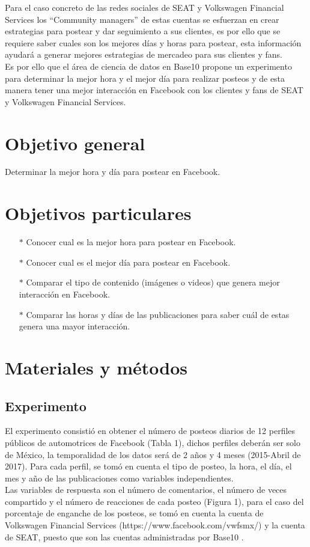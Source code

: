 \documentclass[a4paper,10pt]{article}
\begin{document}
Para el caso concreto de las redes sociales de SEAT y Volkswagen Financial Services
los ``Community managers'' de estas cuentas se esfuerzan en crear estrategias para postear y dar seguimiento a sus clientes,
es por ello que se requiere saber cuales son los mejores días y horas para postear, esta información ayudará a generar mejores estrategias
de mercadeo para sus clientes y fans.\\


Es por ello que el área de ciencia de datos en Base10 propone un experimento
para determinar la mejor hora y el mejor día para realizar posteos y de esta manera
tener una mejor interacción en Facebook con los clientes y fans de SEAT y Volkswagen Financial Services.


\section{Objetivo general}
Determinar la mejor hora y día para postear en Facebook.

\section{Objetivos particulares}
  \begin{itemize}
   \item[$*$] Conocer cual es la  mejor hora para postear en Facebook.
   \item[$*$] Conocer cual es el mejor día para postear en Facebook.
   \item[$*$] Comparar el tipo de contenido (imágenes o videos) que genera mejor interacción en Facebook.
   \item[$*$] Comparar las horas y días de las publicaciones para saber cuál de estas genera una  mayor interacción.
  \end{itemize}


\section{Materiales y métodos}
\subsection{Experimento}
El experimento consistió en obtener el número de posteos diarios de 12 perfiles
públicos de automotrices de Facebook (Tabla 1), dichos perfiles deberán ser solo de México, 
la temporalidad de los datos será de  2 años y 4 meses (2015-Abril de 2017).
Para cada perfil, se tomó en cuenta el tipo de posteo, la hora, el día, el mes y año de 
las publicaciones como variables independientes.\\
Las variables de respuesta son el número de comentarios,
el número de veces compartido y el número de reacciones de cada posteo (Figura 1),
para el caso del porcentaje de enganche de los posteos, se tomó en cuenta
la cuenta de Volkswagen Financial Services (https://www.facebook.com/vwfsmx/)
y la cuenta de SEAT, puesto que son las cuentas administradas por Base10 .
\end{document}
